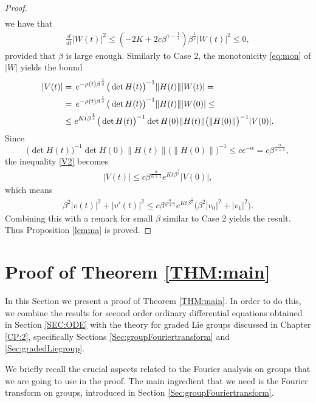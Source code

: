 \documentclass[12pt,oneside,a4paper]{book}
\numberwithin{equation}{section}     %
\theoremstyle{plain}
\theoremstyle{definition}
\begin{document}
\begin{proof}
\begin{align*}
	\end{align*}
	we have that
	\begin{align}\label{eq:mon}
	\frac{d}{dt}|W(t)|^2\leq (-2K+2c\beta^{\gamma-\frac1s}) \beta^{\frac{1}{s}} |W(t)|^2\leq 0,
	\end{align}
	provided that $\beta$ is large enough. Similarly to Case 2, the monotonicity \eqref{eq:mon} of $|W|$ yields the bound
	\begin{align}\notag
	|V(t)|&=\,e^{-\rho(t)\beta^{\frac{1}{s}}}\big(\det  H(t)\big)^{-1}\|H(t)\||W(t)|=\\\notag
	&=\,e^{-\rho(t)\beta^{\frac{1}{s}}}\big(\det  H(t)\big)^{-1}\|H(t)\||W(0)|\leq\\ 
	&\leq e^{Kt\beta^{\frac{1}{s}}}\big(\det H(t)\big)^{-1}\det H(0)\|H(t)\|\big(\|H(0)\|\big)^{-1}|V(0)|.\label{V2}
	\end{align}
	Since 
	\[
	\big(\det H(t)\big)^{-1}\det H(0)\|H(t)\|\big(\|H(0)\|\big)^{-1}\leq c\epsilon^{-\alpha}=c\beta^{\frac{\alpha}{\alpha+1}},
	\]
	the inequality \eqref{V2} becomes 
	\begin{align*}
	|V(t)|\leq c \beta^{\frac{\alpha}{\alpha+1}}e^{Kt\beta^{\frac{1}{s}}}|V(0)|,
	\end{align*}
	which means 
	\begin{align*}
	\beta^2|v(t)|^2+|v'(t)|^2\leq c\beta^{\frac{\alpha}{\alpha+1}}e^{Kt\beta^{\frac{1}{s}}}\big(\beta^2|v_0|^2+|v_1|^2\big).
	\end{align*}
	Combining this with a remark for small $\beta$ similar to Case 2 yields the result.
	Thus Proposition \ref{lemma} is proved.
\end{proof}



\section{Proof of Theorem \ref{THM:main}}
\label{SEC:proof}

In this Section we present a proof of Theorem \ref{THM:main}. In order to do this, we combine the results for second order ordinary differential equations obtained in Section \ref{SEC:ODE} with the theory for graded Lie groups discussed in Chapter \ref{CP:2}, specifically Sections \ref{Sec:groupFouriertransform} and \ref{Sec:gradedLiegroup}.

We briefly recall the crucial aspects related to the Fourier analysis on groups that we are going to use in the proof. The main ingredient that we need is the Fourier transform on groups, introduced in Section \ref{Sec:groupFouriertransform}.
\end{document}
